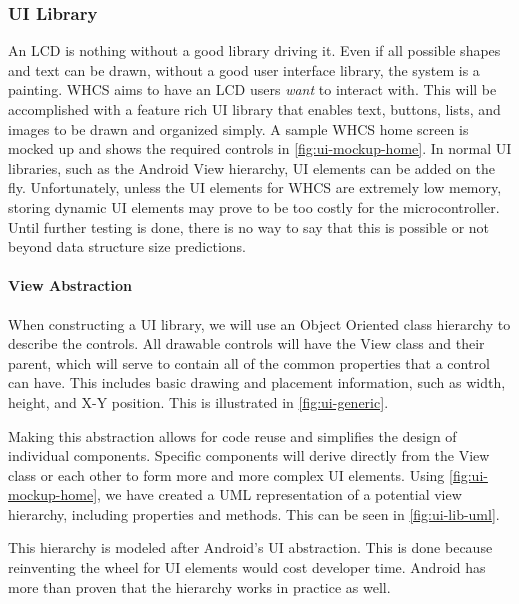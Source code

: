 \subsubsection{UI Library}
\label{sec:ui-lib}
An LCD is nothing without a good library driving it. Even if all possible
shapes and text can be drawn, without a good user interface library, the system
is a painting. WHCS aims to have an LCD users \emph{want} to interact with.
This will be accomplished with a feature rich UI library that enables text,
buttons, lists, and images to be drawn and organized simply. A sample WHCS home screen is mocked up and shows the required controls in \autoref{fig:ui-mockup-home}. 
In normal UI libraries, such as the Android View hierarchy, UI elements can be added on the
fly. Unfortunately, unless the UI elements for WHCS are extremely low memory,
storing dynamic UI elements may prove to be too costly for the microcontroller.
Until further testing is done, there is no way to say that this is possible or
not beyond data structure size predictions.


\paragraph{View Abstraction}
When constructing a UI library, we will use an Object Oriented class hierarchy
to describe the controls. All drawable controls will have the View class and
their parent, which will serve to contain all of the common properties that a
control can have. This includes basic drawing and placement information, such
as width, height, and X-Y position. This is illustrated in \autoref{fig:ui-generic}.


Making this abstraction allows for code reuse and simplifies the design of
individual components. Specific components will derive directly from the View
class or each other to form more and more complex UI elements. Using
\autoref{fig:ui-mockup-home}, we have created a UML representation of a
potential view hierarchy, including properties and methods. This can be seen in
\autoref{fig:ui-lib-uml}.


This hierarchy is modeled after Android's UI abstraction. This is done because
reinventing the wheel for UI elements would cost developer time. Android has
more than proven that the hierarchy works in practice as well.

